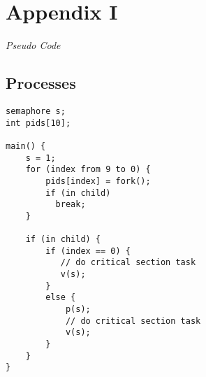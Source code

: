 \documentclass[12pt]{article}
\newcommand {\append}[2] {\section*{Appendix #1} \textsl{\large #2}}
\begin{document}

\newpage
\append{I} {Pseudo Code}

\subsection*{Processes}

\begin{scriptsize}
\begin{verbatim}
semaphore s;
int pids[10];

main() {
    s = 1;
    for (index from 9 to 0) {
        pids[index] = fork();
        if (in child)
          break;
    }

    if (in child) {
        if (index == 0) {
           // do critical section task
           v(s);
        }
        else {
            p(s);
            // do critical section task
            v(s);
        }
    }
}
\end{verbatim}
\end{scriptsize}
\end{document}
